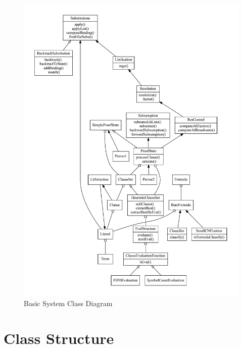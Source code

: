\documentclass{llncs}
\begin{document}
\begin{figure}
  \centering
  \includegraphics[width=6in]{architecture.pdf}
  \caption{Basic System Class Diagram}
  \label{fig:SysArch}
\end{figure}

\section{Class Structure}
\end{document}
